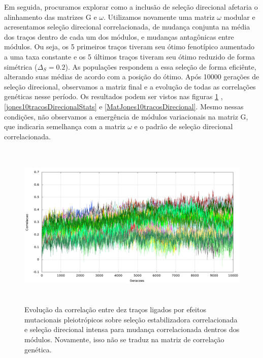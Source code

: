 Em seguida, procuramos explorar como a inclusão de seleção direcional afetaria o
alinhamento das matrizes G e $\omega$. 
Utilizamos novamente uma matriz $\omega$ modular e acresentamos seleção
direcional correlacionada, de mudança conjunta na média dos traços
dentro de cada um dos módulos, e mudanças antagônicas entre módulos. 
Ou seja, os 5 primeiros traços tiveram seu ótimo fenotípico aumentado a
uma taxa constante e os 5 últimos traços tiveram seu ótimo reduzido de
forma simétrica ($\Delta_S=0.2$). 
As populações respondem a essa seleção de forma eficiênte, alterando
suas médias de acordo com a posição do ótimo. 
Após 10000 gerações de seleção direcional, observamos a matriz final
e a evolução de todas as correlações genéticas nesse período. 
Os resultados podem ser vistos nas figuras \ref{jones10tracosDirecional}
, \ref{jones10tracosDirecionalStats} e \ref{MatJones10tracosDirecional}. 
Mesmo nessas condições, não observamos a emergência de módulos
variacionais na matriz G, que indicaria semelhança com a matriz $\omega$
e o padrão de seleção direcional correlacionada. 

\begin{center}
\begin{figure}[htbp]
  \includegraphics[width=150mm, height=80mm]{figuras/jones10tracosDirecional.png}
  \caption{Evolução da correlação entre dez traços ligados por efeitos
  mutacionais pleiotrópicos sobre seleção estabilizadora correlacionada
  e seleção direcional intensa para mudança correlacionada dentros dos
  módulos. Novamente, isso não se traduz na matriz de correlação genética.}
  \label{jones10tracosDirecional}
\end{figure}
\end{center}

